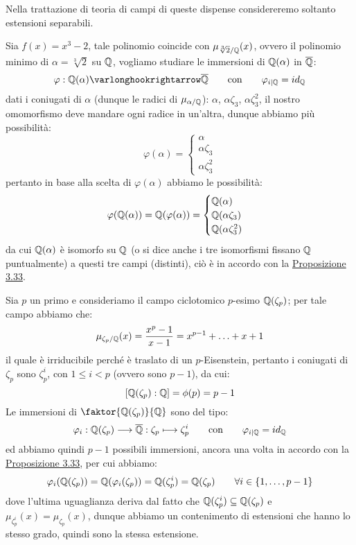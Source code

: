 \documentclass[11pt]{scrartcl}
\begin{document}
Nella trattazione di teoria di campi di queste dispense considereremo soltanto estensioni separabili.

\begin{example}
    Sia $f(x) = x^3 - 2$, tale polinomio coincide con $\mu_{\sqrt[3]{2}/\mathbb Q}(x)$, ovvero il polinomio minimo di $\alpha = \sqrt[3]{2}$ su $\mathbb Q$, vogliamo studiare le immersioni di $\mathbb Q(\alpha)$ in $\overline {\mathbb Q}$:
    \[ \varphi : \QQ(\alpha) \varlonghookrightarrow \overline \QQ \qquad \text{con} \qquad \varphi_{i|\QQ} = id_\QQ
        \]
    dati i coniugati di $\alpha$ (dunque le radici di $\mu_{\alpha/\mathbb Q}$): $\alpha$, $\alpha\zeta_3$, $\alpha\zeta_3^2$, il nostro omomorfismo deve mandare ogni radice in un'altra, dunque abbiamo più possibilità:
    \[ \varphi(\alpha) = \begin{cases}
        \alpha \\
        \alpha\zeta_3 \\
         \alpha\zeta_3^2
        \end{cases}
        \]
    pertanto in base alla scelta di $\varphi(\alpha)$ abbiamo le possibilità:
    \[ \varphi(\mathbb Q(\alpha)) = \mathbb Q(\varphi(\alpha)) = \begin{cases}
        \mathbb Q(\alpha)\\
        \mathbb Q(\alpha\zeta_3)\\
        \mathbb Q(\alpha\zeta_3^2)\\
    \end{cases}
        \]
    da cui $\mathbb Q(\alpha)$ è isomorfo su $\mathbb Q$ (o si dice anche i tre isomorfismi fissano $\mathbb Q$ puntualmente) a questi tre campi (distinti), ciò è in accordo con la \hyperref[3.33]{Proposizione 3.33}.
\end{example}

\begin{example}
    Sia $p$ un primo e consideriamo il campo ciclotomico $p$-esimo $\mathbb Q(\zeta_p)$; per tale campo abbiamo che:
    \[ \mu_{\zeta_p/\mathbb Q} (x) = \frac{x^p - 1}{x -1} = x^{p-1} + \ldots + x + 1
        \] 
    il quale è irriducibile perché è traslato di un $p$-Eisenstein, pertanto i coniugati di $\zeta_p$ sono $\zeta_p^i$, con $1 \leq i < p$ (ovvero sono $p-1$), da cui:
    \[ [\mathbb Q(\zeta_p) : \mathbb Q] = \phi(p) = p - 1 
        \]
    Le immersioni di $\faktor{\QQ(\zeta_p)}{\QQ}$ sono del tipo:
    \[ \varphi_i : \mathbb Q(\zeta_p) \longrightarrow \overline {\mathbb Q} : \zeta_p \longmapsto \zeta_p^i \qquad \text{con} \qquad \varphi_{i|\mathbb Q} = id_\mathbb Q
        \]
    ed abbiamo quindi $p - 1$ possibili immersioni, ancora una volta in accordo con la \hyperref[3.33]{Proposizione 3.33}, per cui abbiamo:
    \[ \varphi_i(\mathbb Q(\zeta_p)) = \mathbb Q(\varphi_i(\zeta_p)) = \mathbb Q(\zeta_p^i) = \mathbb Q(\zeta_p) \qquad \forall i \in \{1,\ldots,p-1\}
        \]
    dove l'ultima uguaglianza deriva dal fatto che $\mathbb Q(\zeta_p^i) \subseteq \mathbb Q(\zeta_p)$ e $\mu_{\zeta_p^i}(x) = \mu_{\zeta_p}(x)$, dunque abbiamo un contenimento di estensioni
    che hanno lo stesso grado, quindi sono la stessa estensione.
\end{example}
\end{document}

